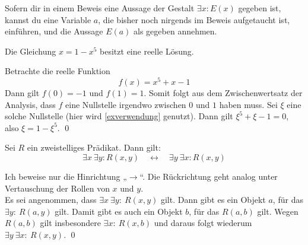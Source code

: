   
  
  
  \begin{axi} \label{exverwendung}
  Sofern dir in einem Beweis eine Aussage der Gestalt $\exists x: E(x)$ gegeben ist, kannst du eine Variable $a$, die bisher noch nirgends im Beweis aufgetaucht ist, einführen, und die Aussage $E(a)$ als gegeben annehmen.
  \end{axi}
  
  
  \begin{bsp}
Die Gleichung $x= 1-x^5$ besitzt eine reelle Lösung.
  \end{bsp}
\begin{bew}
Betrachte die reelle Funktion
\[ f(x) = x^5+x-1 \]
Dann gilt $f(0)=-1$ und $f(1)=1$. Somit folgt aus dem Zwischenwertsatz der Analysis, dass $f$ eine Nullstelle irgendwo zwischen $0$ und $1$ haben muss. Sei $\xi$ eine solche Nullstelle (hier wird \cref{exverwendung} genutzt). Dann gilt $\xi^5+\xi-1=0$, also $\xi=1-\xi^5$. \qed
\end{bew}

 
 
 
 \begin{sat}
  Sei $R$ ein zweistelliges Prädikat. Dann gilt:
  \[ \exists x\ \exists y: R(x,y) \quad\leftrightarrow\quad  \exists y\ \exists x: R(x,y) \]
 \end{sat}
 \begin{bew}
  Ich beweise nur die Hinrichtung „$\to$“. Die Rückrichtung geht analog unter Vertauschung der Rollen von $x$ und $y$. \\
  Es sei angenommen, dass $\exists x\ \exists y:\ R(x,y)$ gilt. Dann gibt es ein Objekt $a$, für das $\exists y:\ R(a,y)$ gilt. Damit gibt es auch ein Objekt $b$, für das $R(a,b)$ gilt. Wegen $R(a,b)$ gilt insbesondere $\exists x:\ R(x,b)$ und daraus folgt wiederum $\exists y\ \exists x:\ R(x,y)$. \qed
 \end{bew}
 
